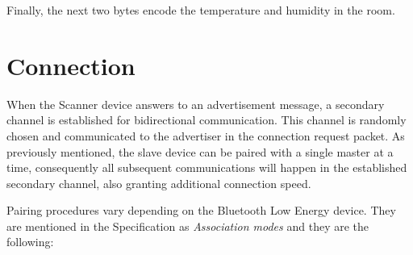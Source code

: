 Finally, the next two bytes encode the temperature and humidity in the room.

\section{Connection}
When the Scanner device answers to an advertisement message, a secondary channel is established for bidirectional communication. This channel is randomly chosen and communicated to the advertiser in the connection request packet. As previously mentioned, the slave device can be paired with a single master at a time, consequently all subsequent communications will happen in the established secondary channel, also granting additional connection speed.

Pairing procedures vary depending on the Bluetooth Low Energy device. They are mentioned in the Specification as \textit{Association modes} and they are the following:
